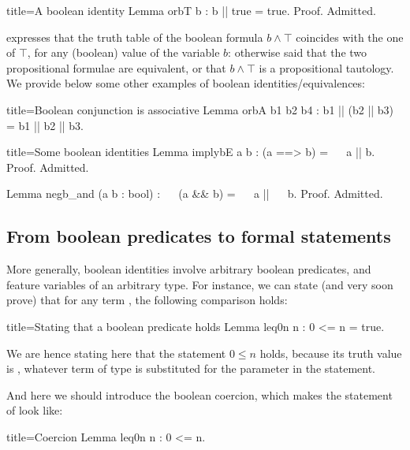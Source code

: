 \begin{coq}{title=A boolean identity}
Lemma orbT b : b || true = true.
Proof. Admitted.
\end{coq}

expresses that the truth table of the boolean formula $b \wedge \top$
coincides with the one of $\top$, for any (boolean) value of the
variable $b$: otherwise said that the two propositional formulae are
equivalent, or that $b \wedge \top$ is a propositional tautology.
We provide below some other examples of boolean
identities/equivalences:

\begin{coq}{title=Boolean conjunction is associative}
Lemma orbA b1 b2 b4 :
  b1 || (b2 || b3) = b1 || b2 || b3.
\end{coq}

\begin{coq}{title=Some boolean identities}
Lemma implybE a b : (a ==> b) = ~~ a || b.
Proof. Admitted.

Lemma negb_and (a b : bool) : ~~ (a && b) = ~~ a || ~~ b.
Proof. Admitted.
\end{coq}



\subsection{From boolean predicates to formal statements}

More generally, boolean identities involve arbitrary boolean
predicates, and feature variables of an arbitrary
type.  For instance, we can state (and very soon prove)
that for any term , the following comparison holds:

\begin{coq}{title=Stating that a boolean predicate holds}
Lemma leq0n n : 0 <= n = true.
\end{coq}
We are hence stating here that the statement $0 \leq n$ holds, because
its truth value is , whatever term  of type  is
substituted for the parameter  in the statement.


And here we should introduce the boolean coercion, which makes the
statement of  look like:

\begin{coq}{title=Coercion}
Lemma leq0n n : 0 <= n.
\end{coq}

